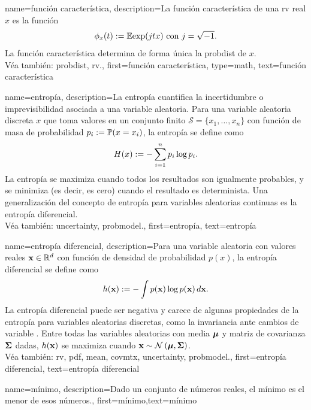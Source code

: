 {name={función característica},
	description={La función característica 
		de una \gls{rv} real $x$ es la función \cite[Sección 26]{BillingsleyProbMeasure}
		$$ \phi_{x}(t) := \mathbb{E} { \exp(j t x) } \mbox{ con } j = \sqrt{-1}.$$
	 La función característica determina de forma única la \gls{probdist} de $x$. 
		\\
		Véa también: \gls{probdist}, \gls{rv}.},
	first={función característica},
	type=math,
	text={función característica}
}



{name={entropía},
	description={La entropía cuantifica la incertidumbre o imprevisibilidad asociada a una variable aleatoria\cite{coverthomas}. 
		Para una variable aleatoria discreta $x$ que toma valores en un conjunto finito 
		$\mathcal{S} = \{x_1, \ldots, x_n\}$ con función de masa de probabilidad 
		$p_i := \mathbb{P}({x = x_i})$, la entropía se define como
		\[
		H(x) := -\sum_{i=1}^n p_i \log p_i.
		\]
		La entropía se maximiza cuando todos los resultados son igualmente probables, y se minimiza 
		(es decir, es cero) cuando el resultado es determinista. Una generalización del concepto 
		de entropía para variables aleatorias continuas es la entropía diferencial.\\
		Véa también: \gls{uncertainty}, \gls{probmodel}.},
	first={entropía},
	text={entropía}
}

{name={entropía diferencial},
	description={Para una variable aleatoria con valores reales ${\bf x} \in \mathbb{R}^{d}$ 
		con función de densidad de probabilidad $p(x)$, la entropía diferencial se define como \cite{coverthomas}
		\[
		h({\bf x}) := - \int p({\bf x}) \log p({\bf x}) \, d{\bf x}.
		\]
		La entropía diferencial puede ser negativa y carece de algunas propiedades de la entropía 
		para variables aleatorias discretas, como la invariancia ante cambios de variable \cite{coverthomas}. 
		Entre todas las variables aleatorias con media ${\bm \mu}$ y matriz de covarianza ${\bf \Sigma}$ dadas, 
		$h({\bf x})$ se maximiza cuando ${\bf x} \sim \mathcal{N}\left({\bm \mu},{\bf \Sigma}\right)$. \\
		Véa también: \gls{rv}, \gls{pdf}, \gls{mean}, \gls{covmtx}, \gls{uncertainty}, \gls{probmodel}.},
	first={entropía diferencial},
	text={entropía diferencial}
}


{
	name=mínimo,
	description={Dado un conjunto de números reales, el mínimo es el menor de esos números.},
	first={mínimo},text={mínimo}
}

